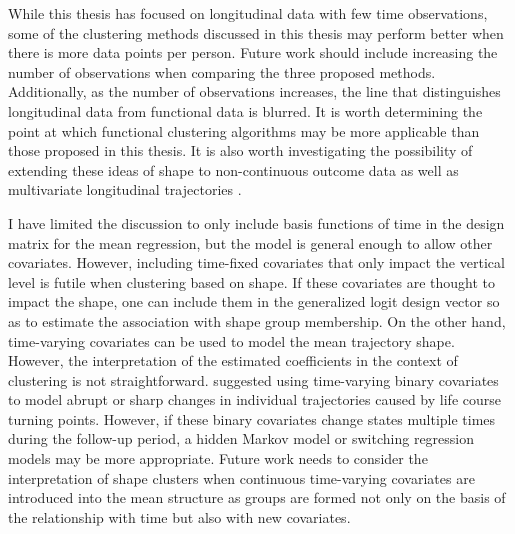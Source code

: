 While this thesis has focused on longitudinal data with few time observations, some of the clustering methods discussed in this thesis may perform better when there is more data points per person. Future work should include increasing the number of observations when comparing the three proposed methods. Additionally, as the number of observations increases, the line that distinguishes longitudinal data from functional data is blurred. It is worth determining the point at which functional clustering algorithms may be more applicable than those proposed in this thesis. It is also worth investigating the possibility of extending these ideas of shape to non-continuous outcome data \cite{jones2001} as well as multivariate longitudinal trajectories \cite{jones2007,d2000}.

I have limited the discussion to only include basis functions of time in the design matrix for the mean regression, but the model is general enough to allow other covariates. However, including time-fixed covariates that only impact the vertical level is futile when clustering based on shape. If these covariates are thought to impact the shape, one can include them in the generalized logit design vector so as to estimate the association with shape group membership. On the other hand, time-varying covariates can be used to model the mean trajectory shape. However, the interpretation of the estimated coefficients in the context of clustering is not straightforward. \Textcite{nagin2003} suggested using time-varying binary covariates to model abrupt or sharp changes in individual trajectories caused by life course turning points. However, if these binary covariates change states multiple times during the follow-up period, a hidden Markov model or switching regression models \cite{quandt1972} may be more appropriate. Future work needs to consider the interpretation of shape clusters when continuous time-varying covariates are introduced into the mean structure as groups are formed not only on the basis of the relationship with time but also with new covariates. 

